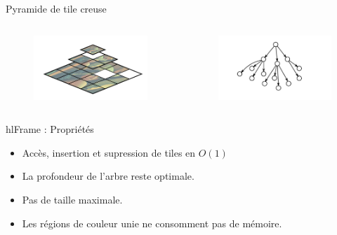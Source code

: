\documentclass[slidetop,compress,mathserif]{beamer}
\begin{document}
	\begin{frame}{Pyramide de tile creuse}
		\begin{columns}
			\begin{column}{0.5\textwidth}
				\begin{figure}[h]
					\includegraphics[width=\textwidth]{images/megatextures-pyramid-nouv}
				\end{figure}
			\end{column}
			\begin{column}{0.5\textwidth}
				\pause
				\begin{figure}[h]
					\includegraphics[width=\textwidth]{images/megatextures-pyramid-links}
				\end{figure}
			\end{column}
		\end{columns}
	\end{frame}
	\begin{frame}{hlFrame : Propriétés}
		\begin{itemize}
			\pause \item Accès, insertion et supression de tiles en $O(1)$
			\pause \item La profondeur de l'arbre reste optimale.
			\pause \item Pas de taille maximale. 
			\pause \item Les régions de couleur unie ne consomment pas de mémoire.
		\end{itemize}
	\end{frame}
\end{document}
